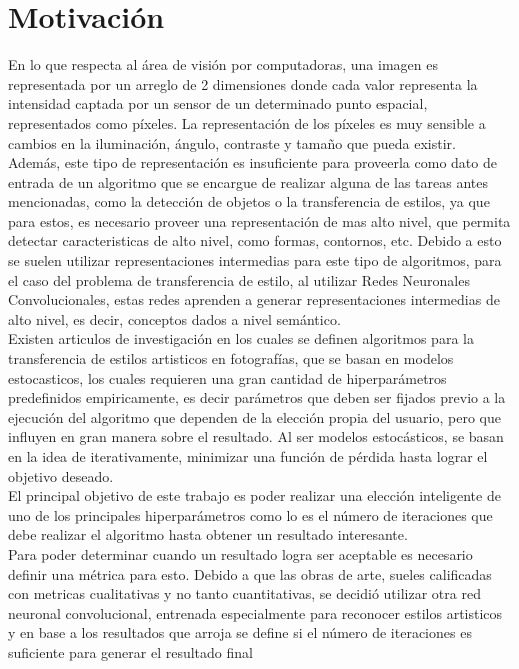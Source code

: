 \documentclass[a4paper,11pt,spanish]{book}
\begin{document}
  \section {Motivación}
    En lo que respecta al área de visión por computadoras, una imagen es representada por un arreglo de 2 dimensiones donde cada valor representa la intensidad captada por un sensor 
    de un determinado punto espacial, representados como píxeles. La representación de los píxeles es muy sensible a cambios en la iluminación, ángulo, contraste y tamaño que pueda existir.\\
    Además, este tipo de representación es insuficiente para proveerla como dato de entrada de un algoritmo que se encargue de realizar alguna de las tareas antes mencionadas, como la
    detección de objetos o la transferencia de estilos, ya que para estos, es necesario proveer una representación de mas alto nivel, que permita detectar caracteristicas de alto nivel,
    como formas, contornos, etc. Debido a esto se suelen utilizar representaciones intermedias para este tipo de algoritmos, para el caso del problema de transferencia de estilo, 
    al utilizar Redes Neuronales Convolucionales, estas redes aprenden a generar representaciones intermedias de alto nivel, es decir, conceptos dados a nivel semántico.\\
    Existen articulos de investigación en los cuales se definen algoritmos para la transferencia de estilos artisticos en fotografías, que se basan en modelos estocasticos, 
    los cuales requieren una gran cantidad de hiperparámetros predefinidos empiricamente, es decir parámetros que deben ser fijados previo a la ejecución del algoritmo que dependen 
    de la elección propia del usuario, pero que influyen en gran manera sobre el resultado. Al ser modelos estocásticos, se basan en la idea de iterativamente, 
    minimizar una función de pérdida hasta lograr el objetivo deseado. \\
    El principal objetivo de este trabajo es poder realizar una elección inteligente de uno de los principales hiperparámetros como lo es el número de iteraciones 
    que debe realizar el algoritmo hasta obtener un resultado interesante. \\
    Para poder determinar cuando un resultado logra ser aceptable es necesario definir una métrica para esto.
    Debido a que las obras de arte, sueles calificadas con metricas cualitativas y no tanto cuantitativas, se decidió utilizar otra red neuronal convolucional, 
    entrenada especialmente para reconocer estilos artisticos y en base a los resultados que arroja se define si el número de iteraciones es suficiente para generar el resultado final 
\end{document}

